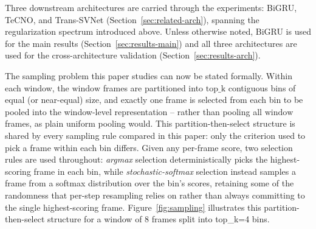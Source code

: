 \documentclass[preprint,12pt]{elsarticle}
\begin{document}
Three downstream architectures are carried through the experiments: BiGRU, TeCNO, and Trans-SVNet (Section~\ref{sec:related-arch}), spanning the regularization spectrum introduced above. Unless otherwise noted, BiGRU is used for the main results (Section~\ref{sec:results-main}) and all three architectures are used for the cross-architecture validation (Section~\ref{sec:results-arch}).

The sampling problem this paper studies can now be stated formally. Within each window, the $\text{window}$ frames are partitioned into $\text{top\_k}$ contiguous bins of equal (or near-equal) size, and exactly one frame is selected from each bin to be pooled into the window-level representation -- rather than pooling all $\text{window}$ frames, as plain uniform pooling would. This partition-then-select structure is shared by every sampling rule compared in this paper: only the criterion used to pick a frame within each bin differs. Given any per-frame score, two selection rules are used throughout: \emph{argmax} selection deterministically picks the highest-scoring frame in each bin, while \emph{stochastic-softmax} selection instead samples a frame from a softmax distribution over the bin's scores, retaining some of the randomness that per-step resampling relies on rather than always committing to the single highest-scoring frame. Figure~\ref{fig:sampling} illustrates this partition-then-select structure for a window of 8 frames split into top\_k=4 bins.
\end{document}
